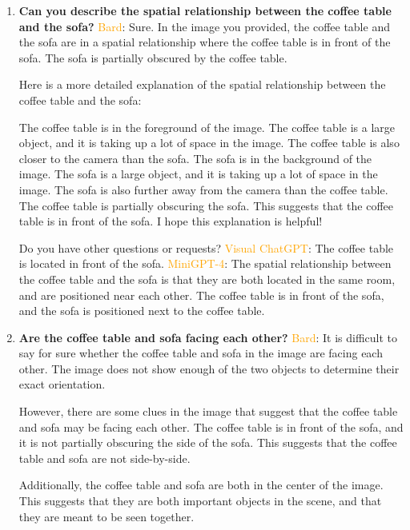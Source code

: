 \begin{enumerate}
    \item \textbf{Can you describe the spatial relationship between the coffee table and the sofa?}
    \subitem \textcolor{orange}{Bard}: 
    Sure. In the image you provided, the coffee table and the sofa are in a spatial relationship where the coffee table is in front of the sofa. The sofa is partially obscured by the coffee table.
    
    Here is a more detailed explanation of the spatial relationship between the coffee table and the sofa:
    
    The coffee table is in the foreground of the image. The coffee table is a large object, and it is taking up a lot of space in the image. The coffee table is also closer to the camera than the sofa.
    The sofa is in the background of the image. The sofa is a large object, and it is taking up a lot of space in the image. The sofa is also further away from the camera than the coffee table.
    The coffee table is partially obscuring the sofa. This suggests that the coffee table is in front of the sofa.
    I hope this explanation is helpful!
    
    Do you have other questions or requests?
    \subitem \textcolor{orange}{Visual ChatGPT}: The coffee table is located in front of the sofa.
    \subitem \textcolor{orange}{MiniGPT-4}: The spatial relationship between the coffee table and the sofa is that they are both located in the same room, and are positioned near each other. The coffee table is in front of the sofa, and the sofa is positioned next to the coffee table.
    \item \textbf{Are the coffee table and sofa facing each other?}
    \subitem \textcolor{orange}{Bard}: 
    It is difficult to say for sure whether the coffee table and sofa in the image are facing each other. The image does not show enough of the two objects to determine their exact orientation.
    
    However, there are some clues in the image that suggest that the coffee table and sofa may be facing each other. The coffee table is in front of the sofa, and it is not partially obscuring the side of the sofa. This suggests that the coffee table and sofa are not side-by-side.
    
    Additionally, the coffee table and sofa are both in the center of the image. This suggests that they are both important objects in the scene, and that they are meant to be seen together.
    

\end{enumerate}
